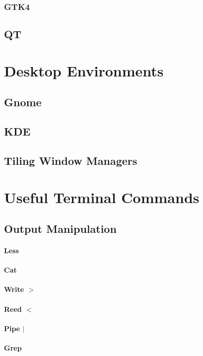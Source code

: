 \subsubsection{GTK4}

\subsection{QT}


\section{Desktop Environments}
\subsection{Gnome}
\subsection{KDE}
\subsection{Tiling Window Managers}


\section{Useful Terminal Commands}
\subsection{Output Manipulation}
\paragraph{Less}
\paragraph{Cat}
\paragraph{Write $>$}
\paragraph{Reed $<$}
\paragraph{Pipe $|$}
\paragraph{Grep}

